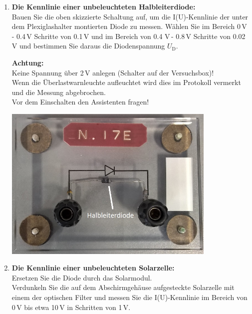 \begin{enumerate}
	\item \textbf{Die Kennlinie einer unbeleuchteten Halbleiterdiode:}\\
		Bauen Sie die oben skizzierte Schaltung auf, um die I(U)-Kennlinie der unter dem Plexiglashalter montierten Diode zu messen. Wählen Sie im Bereich 0\,V - 0.4\,V Schritte von 0.1\,V und im Bereich von 0.4 V\,- 0.8\,V Schritte von 0.02\,V und bestimmen Sie daraus die Diodenspannung $U_{\mathrm{D}}$.\\
		\begin{minipage}{0.6\textwidth}
		\textbf{Achtung: }\\
		Keine Spannung über 2\,V anlegen (Schalter auf der Versuchsbox)!\\
		Wenn die Überlastwarnleuchte aufleuchtet wird dies im Protokoll vermerkt und die Messung abgebrochen.\\
		Vor dem Einschalten den Assistenten fragen!
		\end{minipage}
		\begin{minipage}{0.4\textwidth}
			\includegraphics[width=0.8\textwidth]{Abbildungen/Diode.jpg}
			\label{fig:Bild15}
		\end{minipage}
	\item \textbf{Die Kennlinie einer unbeleuchteten Solarzelle:}\\
		Ersetzen Sie die Diode durch das Solarmodul.\\
		Verdunkeln Sie die auf dem Abschirmgehäuse aufgesteckte Solarzelle mit einem der optischen Filter und messen Sie die I(U)-Kennlinie im Bereich von 0\,V bis etwa 10\,V in Schritten von 1\,V.
 

\end{enumerate}

